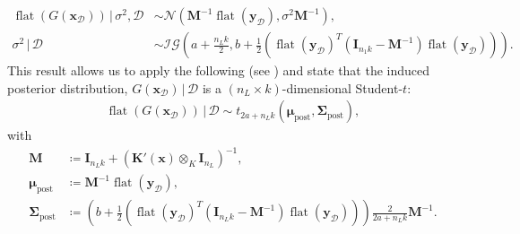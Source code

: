 \documentclass[a4paper, 11pt, reqno]{amsart}
\newcommand{\citet}[2][]{\citeauthor{#2} \cite[#1]{#2}}
\theoremstyle{plain}
\theoremstyle{remark}
\theoremstyle{definition}
\newcommand{\given}{\, | \,}
\newcommand{\normal}[2]{\mathcal{N}\left(#1, #2\right)}
\newcommand{\invgamma}[2]{\mathcal{IG}\left(#1, #2\right)}
\newcommand{\tstud}[3]{t_{#1}\left(#2, #3\right)}
\newcommand{\flatten}[1]{\operatorname{flat}\left(#1\right)}
\newcommand{\train}{\mathcal{D}}
\begin{document}
\begin{equation*}
	\begin{aligned}
		\flatten{G(\bm{x}_{\mathcal{D}})} \given \sigma^2, \train & \sim \normal{\bm{M}^{-1} \flatten{\bm{y}_{\mathcal{D}}}}{\sigma^2 \bm{M}^{-1}}, \\
		\sigma^{2} \given \train & \sim \invgamma{a + \frac{n_L k}{2}}{b + \frac{1}{2} \left(\flatten{\bm{y}_{\mathcal{D}}}^T \left(\bm{I}_{n_1 k} - \bm{M}^{-1}\right) \flatten{\bm{y}_{\mathcal{D}}}\right)}.
	\end{aligned}
\end{equation*}
This result allows us to apply the following  (see \citet{bayesiantheory2009}) and state that the induced posterior distribution, $G(\bm{x}_{\mathcal{D}}) \given \train$ is a $(n_L \times k)$-dimensional Student-$t$:
\begin{equation*}
	\begin{aligned}
		\flatten{G(\bm{x}_{\mathcal{D}})} \given \train \sim \tstud{2a + n_L k}{\bm{\mu}_{\mathrm{post}}}{\bm{\Sigma}_{\mathrm{post}}},
	\end{aligned}
\end{equation*}
with
\begin{equation*}
	\begin{aligned}
		\bm{M} & \coloneqq \bm{I}_{n_L k} + \left(\bm{K}'(\bm{x}) \otimes_K \bm{I}_{n_L}\right)^{-1}, \\
		\bm{\mu}_{\mathrm{post}} & \coloneqq \bm{M}^{-1} \flatten{\bm{y}_{\mathcal{D}}}, \\
		\bm{\Sigma}_{\mathrm{post}} & \coloneqq \left(b + \frac{1}{2} \left(\flatten{\bm{y}_{\mathcal{D}}}^T \left(\bm{I}_{n_L k} - \bm{M}^{-1}\right) \flatten{\bm{y}_{\mathcal{D}}}\right)\right) \frac{2}{2a + n_L k} \bm{M}^{-1}.
	\end{aligned}
\end{equation*}
\end{document}
